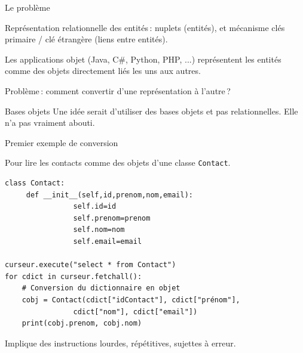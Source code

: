 

\begin{frame}[fragile]{Le problème}

Représentation relationnelle  des entités\,: nuplets (entités),
et mécanisme clés primaire / clé étrangère (liens entre entités).

 
\vfill

Les applications objet (Java, C\#, Python, PHP, ...) représentent les entités
comme des \alert{objets} directement liés les uns aux autres.


\vfill

\alert{Problème}\,: comment \alert{convertir}  d'une représentation à l'autre\,?

\begin{remblock}{Bases objets}
Une idée serait d'utiliser des bases \alert{objets} et
pas relationnelles. Elle n'a pas vraiment abouti.
\end{remblock}

\end{frame}


\begin{frame}[fragile]{Premier exemple de conversion}

Pour lire les contacts comme des objets d'une classe \texttt{Contact}.

\vfill

\begin{verbatim}
class Contact:
     def __init__(self,id,prenom,nom,email):
                self.id=id
                self.prenom=prenom
                self.nom=nom
                self.email=email

curseur.execute("select * from Contact")
for cdict in curseur.fetchall():
    # Conversion du dictionnaire en objet
    cobj = Contact(cdict["idContact"], cdict["prénom"], 
                cdict["nom"], cdict["email"])
    print(cobj.prenom, cobj.nom)
\end{verbatim}


\vfill

Implique des instructions lourdes, répétitives,
sujettes à erreur.
\end{frame}


